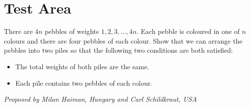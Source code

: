 \documentclass[11pt]{article}
\begin{document}
	
	\section{Test Area}
	
	There are $4n$ pebbles of weights $1, 2, 3, \dots, 4n.$ Each pebble is coloured in one of $n$ colours and there are four pebbles of each colour. Show that we can arrange the pebbles into two piles so that the following two conditions are both satisfied:
\begin{itemize}
\item The total weights of both piles are the same.
\item Each pile contains two pebbles of each colour.
\end{itemize}
\textit{Proposed by Milan Haiman, Hungary and Carl Schildkraut, USA}

	
\end{document}
